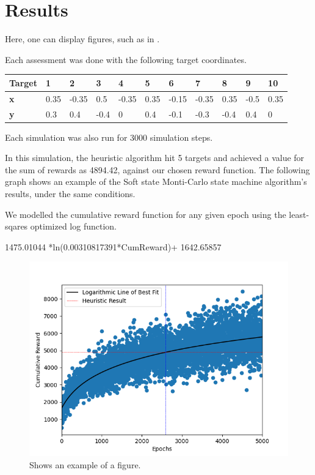 \section{Results}

Here, one can display figures, such as in .

Each assessment was done with the following target coordinates.

\begin{table}[]
    \begin{tabular}{|l|l|l|l|l|l|l|l|l|l|l|}
    \hline
    \textbf{Target} & \textbf{1} & \textbf{2} & \textbf{3} & \textbf{4} & \textbf{5} & \textbf{6} & \textbf{7} & \textbf{8} & \textbf{9} & \textbf{10} \\ \hline
    \textbf{x}      & 0.35       & -0.35      & 0.5        & -0.35      & 0.35       & -0.15      & -0.35      & 0.35       & -0.5       & 0.35        \\ \hline
    \textbf{y}      & 0.3        & 0.4        & -0.4       & 0          & 0.4        & -0.1       & -0.3       & -0.4       & 0.4        & 0           \\ \hline
    \end{tabular}
\end{table}

Each simulation was also run for 3000 simulation steps.

In this simulation, the heuristic algorithm hit 5 targets and achieved a value for the sum of rewards as 4894.42, against our chosen reward function.
The following graph shows an example of the Soft state Monti-Carlo state machine algorithm’s results, under the same conditions.

We modelled the cumulative reward function for any given epoch using the least-sqares optimized log function.

1475.01044  *ln(0.00310817391*CumReward)+ 1642.65857 




\begin{figure}
    \centering
    \includegraphics[width=\singlefigure]{figures/figure_2.png}
    \caption{\label{fig:example} Shows an example of a figure.}
\end{figure}